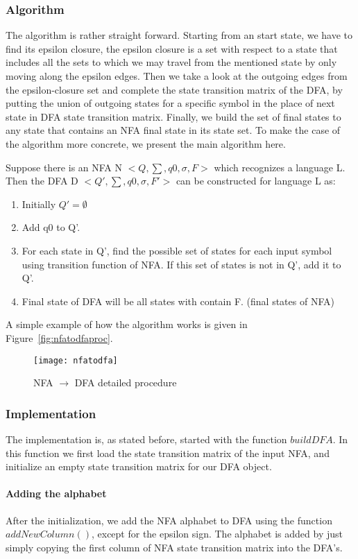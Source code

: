 \documentclass[
12pt, %
a4paper, %
oneside, %
headinclude,footinclude, %
BCOR5mm, %
]{scrartcl}
\begin{document}
\subsubsection{Algorithm}
The algorithm is rather straight forward. Starting from an start state, we have to find its epsilon closure, the epsilon closure is a set with respect to a state that includes all the sets to which we may travel from the mentioned state by only moving along the epsilon edges. Then we take a look at the outgoing edges from the epsilon-closure set and complete the state transition matrix of the DFA, by putting the union of outgoing states for a specific symbol in the place of next state in DFA state transition matrix. Finally, we build the set of final states to any state that contains an NFA final state in its state set. To make the case of the algorithm more concrete, we present the main algorithm here.

Suppose there is an NFA N $< Q, \sum, q0, \sigma, F >$ which recognizes a language L. Then the DFA D $< Q', \sum, q0, \sigma, F'>$ can be constructed for language L as:
\begin{enumerate}
	\item Initially $Q' = \emptyset$
	\item Add q0 to Q’.
	\item For each state in Q’, find the possible set of states for each input symbol using transition function of NFA. If this set of states is not in Q’, add it to Q’.
	\item Final state of DFA will be all states with contain F. (final states of NFA)
\end{enumerate}

A simple example of how the algorithm works is given in Figure~\vref{fig:nfatodfaproc}.
\begin{figure}[tb]
	\centering 
	\texttt{[image: nfatodfa]} 
	\caption[]{NFA $ \rightarrow $ DFA detailed procedure}
	\label{fig:nfatodfaproc} 
\end{figure}

\subsubsection{Implementation}
The implementation is, as stated before, started with the function $buildDFA$. In this function we first load the state transition matrix of the input NFA, and initialize an empty state transition matrix for our DFA object. 

\paragraph{Adding the alphabet} After the initialization, we add the NFA alphabet to DFA using the function $addNewColumn()$, except for the epsilon sign. The alphabet is added by just simply copying the first column of NFA state transition matrix into the DFA's.
\end{document}
